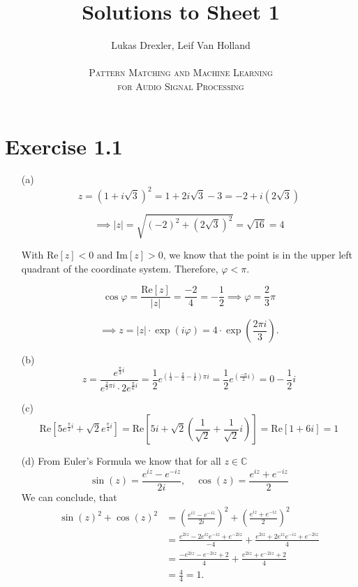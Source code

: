 \documentclass[12pt]{article}
\begin{document}
 
 
\title{Solutions to Sheet 1}
\author{Lukas Drexler, Leif Van Holland \\ \\
\textsc{Pattern Matching and Machine Learning} \\
\textsc{for Audio Signal Processing}}

\maketitle

\section*{Exercise 1.1}
\begin{itemize}
    \item[(a)] \[z = \left(1+i\sqrt{3}\right)^2 = 1+2i\sqrt{3}-3=-2+i(2\sqrt{3})\]
    
     \[\implies |z| = \sqrt{(-2)^2 + (2\sqrt{3})^2} = \sqrt{16} = 4\]
     
     With $\text{Re}[z] < 0$ and $\text{Im}[z] > 0$, we know that the point is in the upper left quadrant of the coordinate system. Therefore, $\varphi < \pi$.
     
     \[\cos \varphi = \frac{\text{Re}[z]}{|z|} = \frac{-2}{4} = -\frac{1}{2} \implies \varphi = \frac{2}{3}\pi\]
     
     \[\implies z = |z|\cdot \exp(i\varphi) = 4\cdot\exp(\frac{2\pi i}{3}).\]
     
     \item[(b)] \[z=\frac{e^{\frac{\pi}{3}i}}{e^{\frac{2}{3}\pi i}\cdot 2e^{\frac{\pi}{6}i}} = \frac{1}{2}e^{(\frac{1}{3}-\frac{2}{3}-\frac{1}{6})\pi i} = \frac{1}{2}e^{(\frac{-\pi}{2}i)} = 0-\frac{1}{2}i\]
     
     \item[(c)] \[\text{Re}\left[5e^{\frac{\pi}{2}i}+\sqrt{2}e^{\frac{\pi}{4}i} \right] = \text{Re}\left[5i + \sqrt{2}(\frac{1}{\sqrt{2}}+\frac{1}{\sqrt{2}}i)\right] = \text{Re}\left[ 1 + 6i \right] = 1\]
     
     \item [(d)] From Euler's Formula we know that for all $z\in\mathbb{C}$
     \[ \sin(z) = \frac{e^{iz}-e^{-iz}}{2i},\quad \cos(z) = \frac{e^{iz}+e^{-iz}}{2} \]
     We can conclude, that
     \begin{align*}
         \sin(z)^2 + \cos(z)^2 &= \left(\frac{e^{iz}-e^{-iz}}{2i}\right)^2 + \left(\frac{e^{iz}+e^{-iz}}{2}\right)^2 \\
         &= \frac{e^{2iz}-2e^{iz}e^{-iz}+e^{-2iz}}{-4} + \frac{e^{2iz}+2e^{iz}e^{-iz}+e^{-2iz}}{4} \\
         &= \frac{-e^{2iz}-e^{-2iz}+2}{4} + \frac{e^{2iz}+e^{-2iz}+2}{4} \\
         &= \frac{4}{4} = 1.
     \end{align*}
     
\end{itemize}
\end{document}

